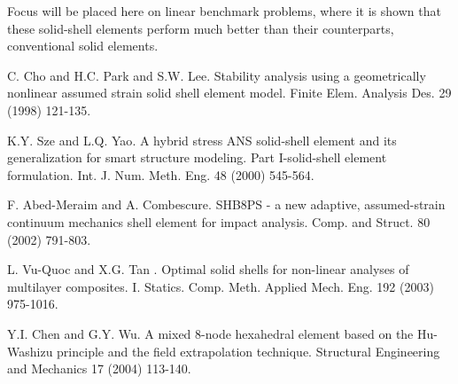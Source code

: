 Focus will be placed here on linear benchmark problems, where it is shown that these solid-shell elements perform much better than their counterparts, conventional solid elements.


\begin{thebibliography}{10}

{\sc C. Cho and H.C. Park and S.W. Lee}. {Stability analysis using a geometrically nonlinear assumed strain solid shell element model}. Finite Elem. Analysis Des. 29 (1998) 121-135.



{\sc K.Y. Sze and L.Q. Yao}. {A hybrid stress ANS solid-shell element and its generalization for smart structure modeling. Part I-solid-shell element formulation}. Int. J. Num. Meth. Eng. 48 (2000) 545-564.



{\sc F. Abed-Meraim and A. Combescure}. {SHB8PS - a new adaptive, assumed-strain continuum mechanics shell element for impact analysis}. Comp. and Struct. 80 (2002) 791-803.



{\sc L. Vu-Quoc and X.G. Tan }. {Optimal solid shells for non-linear analyses of multilayer composites. I. Statics}. Comp. Meth. Applied Mech. Eng. 192 (2003) 975-1016.



{\sc Y.I. Chen and G.Y. Wu}. {A mixed 8-node hexahedral element based on the Hu-Washizu principle and the field extrapolation technique}. Structural Engineering and Mechanics 17 (2004) 113-140.

\end{thebibliography}
